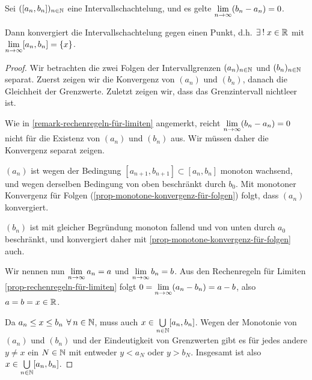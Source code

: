 \begin{lemma}[Intervallschachtelung]
    \label{lem-nested-intervals}
    Sei $([a_n, b_n])_{n \in \mathbb{N}}$ eine Intervallschachtelung, und es gelte $\lim\limits_{n \rightarrow \infty} (b_n - a_n) = 0$.
    
    Dann konvergiert die Intervallschachtelung gegen einen Punkt, d.h.$\exists! \; x \in \R$ mit $\lim\limits_{n \rightarrow \infty} [a_n, b_n] = \{x\}$.
\end{lemma}
\begin{proof}
    Wir betrachten die zwei Folgen der Intervallgrenzen $(a_n)_{n \in \mathbb{N}}$ und $(b_n)_{n \in \mathbb{N}}$ separat. Zuerst zeigen wir die Konvergenz von $(a_n)$ und $(b_n)$, danach die Gleichheit der Grenzwerte. Zuletzt zeigen wir, dass das Grenzintervall nichtleer ist.
    
    Wie in \ref{remark-rechenregeln-für-limiten} angemerkt, reicht $\lim\limits_{n \rightarrow \infty} (b_n - a_n) = 0$ nicht für die Existenz von $(a_n)$ und $(b_n)$ aus. Wir müssen daher die Konvergenz separat zeigen.
    
    $(a_n)$ ist wegen der Bedingung $[a_{n+1}, b_{n+1}] \subset [a_n, b_n]$ monoton wachsend, und wegen derselben Bedingung von oben beschränkt durch $b_0$. Mit monotoner Konvergenz für Folgen (\ref{prop-monotone-konvergenz-für-folgen}) folgt, dass $(a_n)$ konvergiert.

    $(b_n)$ ist mit gleicher Begründung monoton fallend und von unten durch $a_0$ beschränkt, und konvergiert daher mit \ref{prop-monotone-konvergenz-für-folgen} auch.

    Wir nennen nun $\lim\limits_{n \rightarrow \infty} a_n = a$ und $\lim\limits_{n \rightarrow \infty} b_n = b$. Aus den Rechenregeln für Limiten \ref{prop-rechenregeln-für-limiten} folgt $0 = \lim\limits_{n \rightarrow \infty} (a_n - b_n) = a - b$, also $a = b = x \in \mathbb{R}$.
    
    Da $a_n \leq x \leq b_n \forall n \in \N$, muss auch $x \in \bigcup\limits_{n \in \mathbb{N}} [a_n, b_n]$. Wegen der Monotonie von $(a_n)$ und $(b_n)$ und der Eindeutigkeit von Grenzwerten gibt es für jedes andere $y \neq x$ ein $N \in \mathbb{N}$ mit entweder $y < a_N$ oder $y > b_N$. Insgesamt ist also $x \in \bigcup\limits_{n \in \mathbb{N}} [a_n, b_n]$.
\end{proof}

